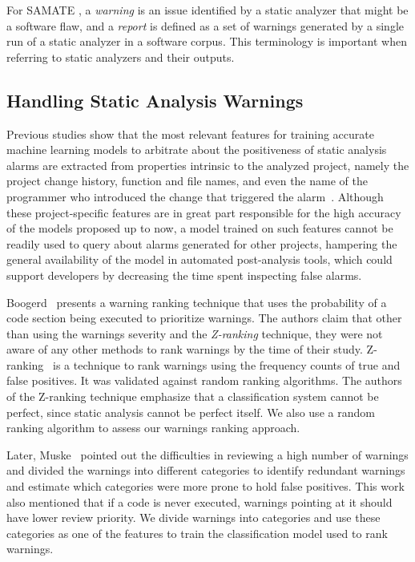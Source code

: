 For SAMATE \cite{black_counting_2011}, a \textit{warning} is an issue identified
by a static analyzer that might be a software flaw, and a \textit{report} is
defined as a set of warnings generated by a single run of a static analyzer in
a software corpus. This terminology is important when referring to static
analyzers and their outputs.

\subsection{Handling Static Analysis Warnings}
\label{sub:related_work}

Previous studies show that the most relevant features for training accurate
machine learning models to arbitrate about the positiveness of static analysis
alarms are extracted from properties intrinsic to the analyzed project,
namely the project change history, function and file names, and even the name
of the programmer who introduced the change that triggered the
alarm~\cite{kremenek2004correlation, heckman2009model, jung2005taming,
ruthruff_predicting_2008, yoon2014reducing}. Although these project-specific
features are in great part responsible for the high accuracy of the models
proposed up to now, a model trained on such features cannot be readily used to
query about alarms generated for other projects, hampering the general
availability of the model in automated post-analysis tools, which could
support developers by decreasing the time spent inspecting false alarms.

Boogerd~\cite{boogerd2006prioritizing} presents a warning ranking technique
that uses the probability of a code section being executed to prioritize
warnings. The authors claim that other than using the warnings severity and the
\textit{Z-ranking} technique, they were not aware of any other methods to rank
warnings by the time of their study. Z-ranking~\cite{kremenek2003z} is a
technique to rank warnings using the frequency counts of true and false
positives. It was validated against random ranking algorithms. The
authors of the Z-ranking technique emphasize that a classification system
cannot be perfect, since static analysis cannot be perfect itself.
We also use a random ranking algorithm to assess our warnings ranking approach.

Later, Muske~\cite{muske2013review} pointed out the difficulties in reviewing a high
number of warnings and divided the warnings into different categories to identify
redundant warnings and estimate which categories were more prone to hold false
positives. This work also mentioned that if a code is never executed,
warnings pointing at it should have lower review priority.
We divide warnings into categories and use these categories as one of the features
to train the classification model used to rank warnings.

